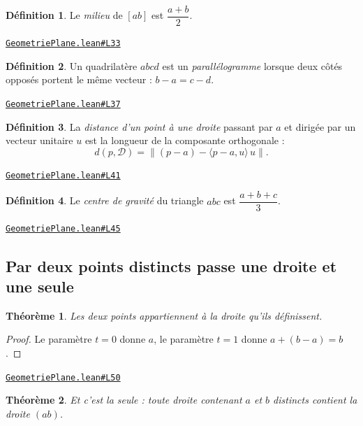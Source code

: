 \documentclass[11pt,a4paper]{article}
\theoremstyle{definition}
\newtheorem{definition}{Définition}
\theoremstyle{plain}
\newtheorem{theoreme}{Théorème}
\newcommand{\source}[2]{\par\smallskip\noindent\hfill{\footnotesize\href{#1}{\texttt{#2}}}\par\smallskip}
\begin{document}
\begin{definition}
Le \emph{milieu} de $[ab]$ est $\dfrac{a + b}{2}$.
\end{definition}
\source{https://github.com/Commutator-IO/learn-lean/blob/main/cours/01-college/02-geometrie-plane/GeometriePlane.lean\#L33}{GeometriePlane.lean\#L33}

\begin{definition}
Un quadrilatère $abcd$ est un \emph{parallélogramme} lorsque deux côtés opposés portent
le même vecteur : $b - a = c - d$.
\end{definition}
\source{https://github.com/Commutator-IO/learn-lean/blob/main/cours/01-college/02-geometrie-plane/GeometriePlane.lean\#L37}{GeometriePlane.lean\#L37}

\begin{definition}
La \emph{distance d'un point à une droite} passant par $a$ et dirigée par un vecteur
unitaire $u$ est la longueur de la composante orthogonale :
\[ d(p, \mathcal{D}) = \bigl\| (p - a) - \langle p - a, u\rangle\, u \bigr\| . \]
\end{definition}
\source{https://github.com/Commutator-IO/learn-lean/blob/main/cours/01-college/02-geometrie-plane/GeometriePlane.lean\#L41}{GeometriePlane.lean\#L41}

\begin{definition}
Le \emph{centre de gravité} du triangle $abc$ est $\dfrac{a + b + c}{3}$.
\end{definition}
\source{https://github.com/Commutator-IO/learn-lean/blob/main/cours/01-college/02-geometrie-plane/GeometriePlane.lean\#L45}{GeometriePlane.lean\#L45}

\subsection{Par deux points distincts passe une droite et une seule}

\begin{theoreme}
Les deux points appartiennent à la droite qu'ils définissent.
\end{theoreme}

\begin{proof}
Le paramètre $t = 0$ donne $a$, le paramètre $t = 1$ donne $a + (b - a) = b$.
\end{proof}
\source{https://github.com/Commutator-IO/learn-lean/blob/main/cours/01-college/02-geometrie-plane/GeometriePlane.lean\#L50}{GeometriePlane.lean\#L50}

\begin{theoreme}
Et c'est la seule : toute droite contenant $a$ et $b$ distincts contient la droite
$(ab)$.
\end{theoreme}
\end{document}
